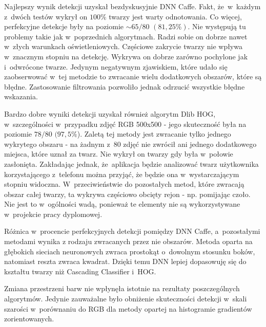 Najlepszy wynik detekcji uzyskał bezdyskusyjnie DNN Caffe. Fakt, że~w~każdym z~dwóch testów wykrył on $100 \%$ twarzy jest warty odnotowania. Co więcej, perfekcyjne detekcje były na poziomie $\sim65/80$ $(81,25 \%)$. Nie występują tu problemy takie jak w~poprzednich algorytmach. Radzi sobie on dobrze nawet w~złych warunkach oświetleniowych. Częściowe zakrycie twarzy nie wpływa w~znacznym stopniu na detekcję. Wykrywa on dobrze zarówno pochylone jak i~odwrócone twarze. Jedynym negatywnym zjawiskiem, które udało się zaobserwować w~tej metodzie to zwracanie wielu dodatkowych obszarów, które są błędne. Zastosowanie filtrowania pozwoliło jednak odrzucić wszystkie błędne wskazania.

\par

Bardzo dobre wyniki detekcji uzyskał również algorytm Dlib HOG, w~szczególności w~przypadku zdjęć RGB 500x500 - jego skuteczność była na poziomie $78/80$ $(97,5 \%$). Zaletą tej metody jest zwracanie tylko jednego wykrytego obszaru - na żadnym z~80 zdjęć nie zwrócił ani jednego dodatkowego miejsca, które uznał za twarz. Nie wykrył on twarzy gdy była w~połowie zasłonięta. Zakładając jednak, że~aplikacja będzie analizować twarz użytkownika korzystającego z~telefonu można przyjąć, że będzie ona w~wystarczającym stopniu widoczna. W~przeciwieństwie do pozostałych metod, które zwracają obszar całej twarzy, ta wykrywa częściowo obcięty rejon - np. pomijając czoło. Nie jest to w~ogólności wadą, ponieważ te elementy nie są wykorzystywane w~projekcie pracy dyplomowej.

\vspace{5mm}

Różnica w~procencie perfekcyjnych detekcji pomiędzy DNN Caffe, a~pozostałymi metodami wynika z rodzaju zwracanych przez nie obszarów. Metoda oparta na głębokich sieciach neuronowych zwraca prostokąt o~dowolnym stosunku boków, natomiast reszta zwraca kwadrat. Dzięki temu DNN lepiej dopasowuję się do kształtu twarzy niż Cascading Classifier i~HOG.

\vspace{5mm}

Zmiana przestrzeni barw nie wpłynęła istotnie na rezultaty poszczególnych algorytmów. Jedynie zauważalne było obniżenie skuteczności detekcji w~skali szarości w~porównaniu do RGB dla metody opartej na histogramie gradientów zorientowanych.







